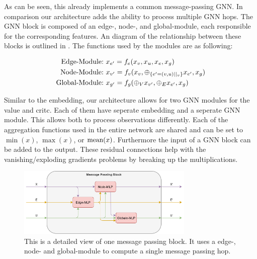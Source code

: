 As can be seen, this already implements a common message-passing GNN. In comparison our architecture adds the ability to process multiple GNN hops.
The GNN block is composed of an edge-, node-, and global-module, each responsible for the corresponding features. An diagram of the relationship between these blocks is outlined in . The functions used by the modules are as following:

\begin{equation}
    \begin{aligned}
        \textup{Edge-Module:}\ & x_{e'} = f_e(x_v, x_u, x_e, x_g)\\
        \textup{Node-Module:}\ & x_{v'} = f_v(x_v, \oplus_{\{e'=(v,u)||_v\}} x_{e'}, x_g)\\
        \textup{Global-Module:}\ & x_{g'} = f_g(\oplus_V x_{v'}, \oplus_E x_{e'}, x_g)
    \end{aligned}
    \nonumber
\end{equation}

Similar to the embedding, our architecture allows for two GNN modules for the value and critc. Each of them have seperate embedding and a seperate GNN module. This allows both to process observations differently. Each of the aggregation functions used in the entire network are shared and can be set to $\min(x)$, $\max(x)$, or $\textup{mean}(x)$. Furthermore the input of a GNN block can be added to the output. These residual connections help with the vanishing/exploding gradients problems by breaking up the multiplications.

\begin{figure}[htp]
    \centering
    \includegraphics[width=0.75\textwidth]{figures/message_passing_block.png}
    \hspace{1cm}   
    \caption{This is a detailed view of one message passing block. It uses a edge-, node- and global-module to compute a single message passing hop.}
    \label{fig:message_passing_block}
\end{figure}



